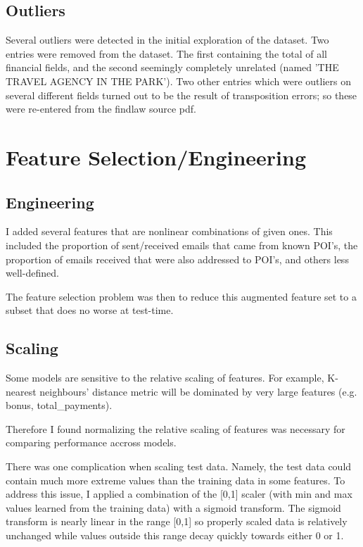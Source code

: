 \documentclass{article}
\begin{document}
\subsection{Outliers}

Several outliers were detected in the initial exploration of the dataset. Two entries were removed from the dataset. The first containing the total of all financial fields, and the second seemingly completely unrelated (named 'THE TRAVEL AGENCY IN THE PARK'). Two other entries which were outliers on several different fields turned out to be the result of transposition errors; so these were re-entered from the findlaw source pdf.

\section{Feature Selection/Engineering}


\subsection{Engineering}

I added several features that are nonlinear combinations of given ones. This included the proportion of sent/received emails that came from known POI's, the proportion of emails received that were also addressed to POI's, and others less well-defined.

The feature selection problem was then to reduce this augmented feature set to a subset that does no worse at test-time. 

\subsection{Scaling}

Some models are sensitive to the relative scaling of features. For example, K-nearest neighbours' distance metric will be dominated by very large features (e.g. bonus, total\_payments).

Therefore I found normalizing the relative scaling of features was necessary for comparing performance accross models. 

There was one complication when scaling test data. Namely, the test data could contain much more extreme values than the training data in some features. To address this issue, I applied a combination of the [0,1] scaler (with min and max values learned from the training data) with a sigmoid transform. The sigmoid transform is nearly linear in the range [0,1] so properly scaled data is relatively unchanged while values outside this range decay quickly towards either 0 or 1.
\end{document}

